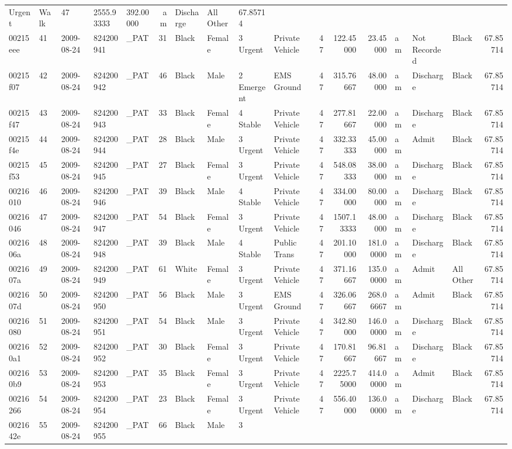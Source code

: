 \documentclass[]{elsarticle} %
\begin{document}
\begin{longtable}[]{@{}lllllrllllrrrlllr@{}}
Urgent & Walk & 47 & 2555.93333 & 392.00000 & am & Discharge & All Other
& 67.85714\tabularnewline
00215eee & 41 & 2009-08-24 & 824200941 & \_PAT & 31 & Black & Female & 3
Urgent & Private Vehicle & 47 & 122.45000 & 23.45000 & am & Not Recorded
& Black & 67.85714\tabularnewline
00215f07 & 42 & 2009-08-24 & 824200942 & \_PAT & 46 & Black & Male & 2
Emergent & EMS Ground & 47 & 315.76667 & 48.00000 & am & Discharge &
Black & 67.85714\tabularnewline
00215f47 & 43 & 2009-08-24 & 824200943 & \_PAT & 33 & Black & Female & 4
Stable & Private Vehicle & 47 & 277.81667 & 22.00000 & am & Discharge &
Black & 67.85714\tabularnewline
00215f4e & 44 & 2009-08-24 & 824200944 & \_PAT & 28 & Black & Male & 3
Urgent & Private Vehicle & 47 & 332.33333 & 45.00000 & am & Admit &
Black & 67.85714\tabularnewline
00215f53 & 45 & 2009-08-24 & 824200945 & \_PAT & 27 & Black & Female & 3
Urgent & Private Vehicle & 47 & 548.08333 & 38.00000 & am & Discharge &
Black & 67.85714\tabularnewline
00216010 & 46 & 2009-08-24 & 824200946 & \_PAT & 39 & Black & Male & 4
Stable & Private Vehicle & 47 & 334.00000 & 80.00000 & am & Discharge &
Black & 67.85714\tabularnewline
00216046 & 47 & 2009-08-24 & 824200947 & \_PAT & 54 & Black & Female & 3
Urgent & Private Vehicle & 47 & 1507.13333 & 48.00000 & am & Discharge &
Black & 67.85714\tabularnewline
0021606a & 48 & 2009-08-24 & 824200948 & \_PAT & 39 & Black & Male & 4
Stable & Public Trans & 47 & 201.10000 & 181.00000 & am & Discharge &
Black & 67.85714\tabularnewline
0021607a & 49 & 2009-08-24 & 824200949 & \_PAT & 61 & White & Female & 3
Urgent & Private Vehicle & 47 & 371.16667 & 135.00000 & am & Admit & All
Other & 67.85714\tabularnewline
0021607d & 50 & 2009-08-24 & 824200950 & \_PAT & 56 & Black & Male & 3
Urgent & EMS Ground & 47 & 326.06667 & 268.06667 & am & Admit & Black &
67.85714\tabularnewline
00216080 & 51 & 2009-08-24 & 824200951 & \_PAT & 54 & Black & Male & 3
Urgent & Private Vehicle & 47 & 342.80000 & 146.00000 & am & Discharge &
Black & 67.85714\tabularnewline
002160a1 & 52 & 2009-08-24 & 824200952 & \_PAT & 30 & Black & Female & 3
Urgent & Private Vehicle & 47 & 170.81667 & 96.81667 & am & Discharge &
Black & 67.85714\tabularnewline
002160b9 & 53 & 2009-08-24 & 824200953 & \_PAT & 35 & Black & Female & 3
Urgent & Private Vehicle & 47 & 2225.75000 & 414.00000 & am & Admit &
Black & 67.85714\tabularnewline
00216266 & 54 & 2009-08-24 & 824200954 & \_PAT & 23 & Black & Female & 3
Urgent & Private Vehicle & 47 & 556.40000 & 136.00000 & am & Discharge &
Black & 67.85714\tabularnewline
0021642e & 55 & 2009-08-24 & 824200955 & \_PAT & 66 & Black & Male & 3

\end{longtable}
\end{document}
